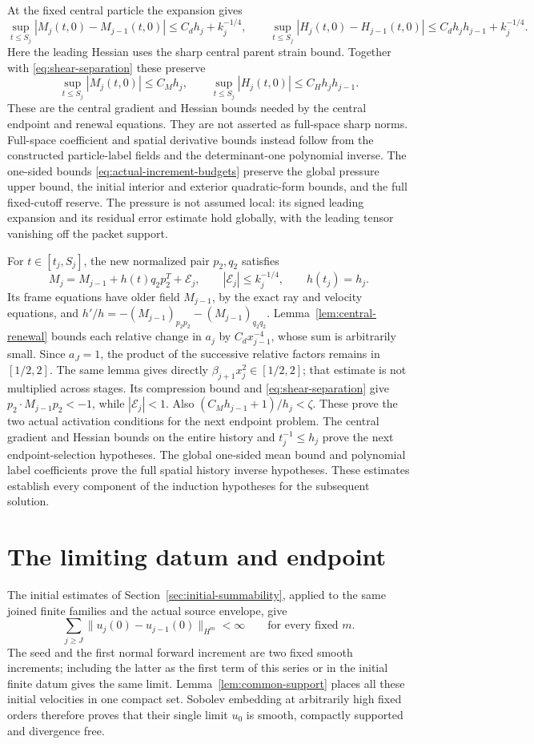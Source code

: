 \documentclass[11pt]{article}
\theoremstyle{definition}
\begin{document}
At the fixed central particle the expansion gives
\[
 \sup_{t\leq S_j}|M_j(t,0)-M_{j-1}(t,0)|
       \leq C_dh_j+k_j^{-1/4},\qquad
 \sup_{t\leq S_j}|H_j(t,0)-H_{j-1}(t,0)|
       \leq C_dh_jh_{j-1}+k_j^{-1/4}.
\]
Here the leading Hessian uses the sharp central parent strain bound.
Together with \eqref{eq:shear-separation} these preserve
\[
 \sup_{t\leq S_j}|M_j(t,0)|\leq C_Mh_j,\qquad
 \sup_{t\leq S_j}|H_j(t,0)|\leq C_Hh_jh_{j-1}.
\]
These are the central gradient and Hessian bounds needed by the central endpoint and
renewal equations. They are not asserted as full-space sharp norms.
Full-space coefficient and spatial derivative bounds instead follow
from the constructed particle-label fields and the determinant-one
polynomial inverse. The one-sided bounds
\eqref{eq:actual-increment-budgets} preserve the global pressure upper
bound, the initial interior and exterior quadratic-form bounds, and
the full fixed-cutoff reserve. The pressure is not assumed local:
its signed leading expansion and its residual error estimate hold
globally, with the leading tensor vanishing off the packet support.

For $t\in[t_j,S_j]$, the new normalized pair $p_2,q_2$ satisfies
\[
 M_j=M_{j-1}+h(t)q_2p_2^T+\mathcal E_j,
 \qquad |\mathcal E_j|\leq k_j^{-1/4},\qquad h(t_j)=h_j.
\]
Its frame equations have older field $M_{j-1}$, by the exact ray and
velocity equations, and $h'/h=-(M_{j-1})_{p_2p_2}-(M_{j-1})_{q_2q_2}$.
Lemma~\ref{lem:central-renewal} bounds each relative change in $a_j$
by $C_dx_{j-1}^{-4}$, whose sum is arbitrarily small. Since $a_J=1$,
the product of the successive relative factors remains in $[1/2,2]$. The same lemma gives directly
$\beta_{j+1}x_j^2\in[1/2,2]$; that estimate is not multiplied across
stages. Its compression bound and \eqref{eq:shear-separation} give
$p_2\cdot M_{j-1}p_2<-1$, while $|\mathcal E_j|<1$.
Also $(C_Mh_{j-1}+1)/h_j<\zeta$. These prove the two actual activation
conditions for the next endpoint problem. The central gradient and Hessian bounds on the entire
history and $t_j^{-1}\leq h_j$ prove the next endpoint-selection
hypotheses. The global one-sided mean bound and polynomial label
coefficients prove the full spatial history inverse hypotheses.
These estimates establish every component of the induction hypotheses
for the subsequent solution.

\section{The limiting datum and endpoint}
\label{sec:endpoint}
The initial estimates of Section~\ref{sec:initial-summability}, applied
to the same joined finite families and the actual source envelope, give
\[
 \sum_{j\geq J}\|u_j(0)-u_{j-1}(0)\|_{H^m}<\infty
                         \qquad\text{for every fixed }m.
\]
The seed and the first normal forward increment are two fixed
smooth increments; including the latter as the first term of this
series or in the initial finite datum gives the same limit.
Lemma~\ref{lem:common-support}
places all these initial velocities in one compact set. Sobolev embedding
at arbitrarily high fixed orders therefore proves that their single limit
$u_0$ is smooth, compactly supported and divergence free.
\end{document}
